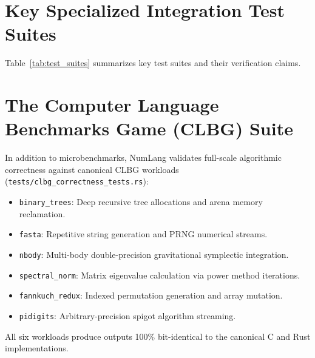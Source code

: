\section{Key Specialized Integration Test Suites}
\label{sec:testing:suites}

Table~\ref{tab:test_suites} summarizes key test suites and their verification claims.

\begin{table}[h!]
\centering
{}
\caption{Key specialized verification test suites in NumLang.}
\label{tab:test_suites}
\end{table}

\section{The Computer Language Benchmarks Game (CLBG) Suite}
\label{sec:testing:clbg}

In addition to microbenchmarks, NumLang validates full-scale algorithmic correctness against canonical CLBG workloads (\texttt{tests/clbg\_correctness\_tests.rs}):
\begin{itemize}
    \item \texttt{binary\_trees}: Deep recursive tree allocations and arena memory reclamation.
    \item \texttt{fasta}: Repetitive string generation and PRNG numerical streams.
    \item \texttt{nbody}: Multi-body double-precision gravitational symplectic integration.
    \item \texttt{spectral\_norm}: Matrix eigenvalue calculation via power method iterations.
    \item \texttt{fannkuch\_redux}: Indexed permutation generation and array mutation.
    \item \texttt{pidigits}: Arbitrary-precision spigot algorithm streaming.
\end{itemize}
All six workloads produce outputs 100\% bit-identical to the canonical C and Rust implementations.

